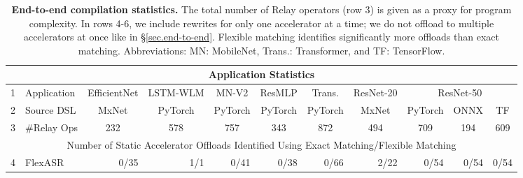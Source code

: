\begin{table*}
  \centering
  \caption{
  \textbf{End-to-end compilation statistics.}
  The total number of Relay operators (row 3) is given as a proxy
  for program complexity.
  In rows 4-6, we include rewrites for only one accelerator at a time; we do not offload to multiple accelerators at once like in \S\ref{sec.end-to-end}. Flexible matching identifies significantly more offloads than exact matching.
  Abbreviations: MN: MobileNet, Trans.: Transformer, and TF: TensorFlow.
  }
  \label{tab.compilation}
  \begin{small}
  \begin{tabular}{|clrrrrrr||rrr|}
  \hline
  \multicolumn{11}{|c|}{Application Statistics} \\ \hline
  \multicolumn{1}{|c|}{1} &
    \multicolumn{1}{|l|}{Application} &
    \multicolumn{1}{c|}{EfficientNet} &
    \multicolumn{1}{c|}{LSTM-WLM} &
    \multicolumn{1}{c|}{MN-V2} &
    \multicolumn{1}{c|}{ResMLP} &
    \multicolumn{1}{c|}{Trans.} &
    \multicolumn{1}{c||}{ResNet-20} &
    \multicolumn{3}{c|}{ResNet-50}
    \\ \hline
  \multicolumn{1}{|c|}{2} &
    \multicolumn{1}{|l|}{Source DSL} &
    \multicolumn{1}{c|}{MxNet} &
    \multicolumn{1}{c|}{PyTorch} &
    \multicolumn{1}{c|}{PyTorch} &
    \multicolumn{1}{c|}{PyTorch} &
    \multicolumn{1}{c|}{PyTorch} & 
    \multicolumn{1}{c||}{MxNet} &
    \multicolumn{1}{c|}{PyTorch} &
    \multicolumn{1}{c|}{ONNX} &
    \multicolumn{1}{c|}{TF}
    \\ \hline
  \multicolumn{1}{|c|}{3} &
    \multicolumn{1}{|c|}{\#Relay Ops} &
    \multicolumn{1}{c|}{232} &
    \multicolumn{1}{c|}{578} &
    \multicolumn{1}{c|}{757} &
    \multicolumn{1}{c|}{343} &
    \multicolumn{1}{c|}{872} &
    \multicolumn{1}{c||}{494} &
    \multicolumn{1}{c|}{709} &
    \multicolumn{1}{c|}{194} &
    \multicolumn{1}{c|}{609}
    \\ \hline \hline
  \multicolumn{11}{|c|}{Number of Static Accelerator Offloads Identified Using Exact Matching/Flexible Matching} \\ \hline
  \multicolumn{1}{|c|}{4} &
    \multicolumn{1}{|l|}{FlexASR} &
    \multicolumn{1}{r|}{0/35} &
    \multicolumn{1}{r|}{1/1} &
    \multicolumn{1}{r|}{0/41} &
    \multicolumn{1}{r|}{0/38} &
    \multicolumn{1}{r|}{0/66} &
    \multicolumn{1}{r||}{2/22} &
    \multicolumn{1}{r|}{0/54} &
    \multicolumn{1}{r|}{0/54} &
    \multicolumn{1}{r|}{0/54}

\end{tabular}
\end{small}
\end{table*}
